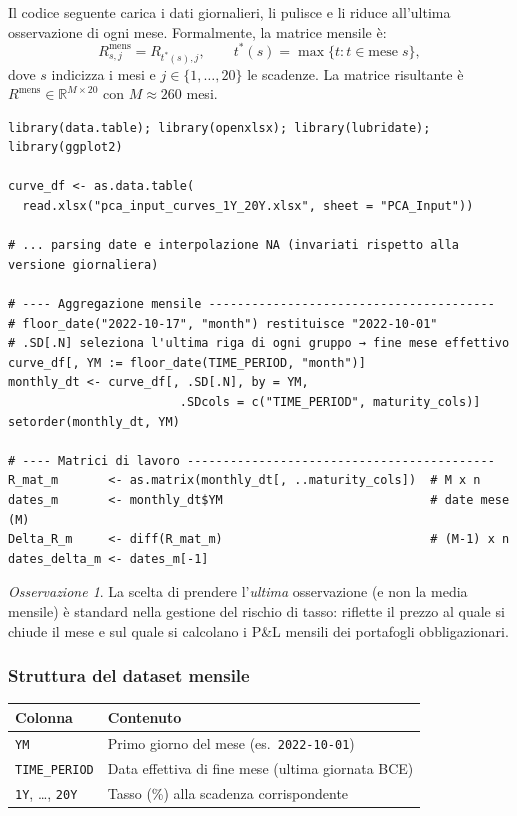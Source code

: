 \documentclass[11pt,a4paper]{article}
\theoremstyle{plain}
\theoremstyle{definition}
\theoremstyle{remark}
\newtheorem*{osservazione}{Osservazione}
\begin{document}
Il codice seguente carica i dati giornalieri, li pulisce e li riduce all'ultima
osservazione di ogni mese. Formalmente, la matrice mensile è:
\[
R^{\text{mens}}_{s,j} = R_{t^*(s),j}, \qquad
t^*(s) = \max\{t : t \in \text{mese}\; s\},
\]
dove $s$ indicizza i mesi e $j \in \{1,\ldots,20\}$ le scadenze.
La matrice risultante è $R^{\text{mens}} \in \mathbb{R}^{M \times 20}$
con $M \approx 260$ mesi. 

\begin{codebox}
\begin{Verbatim}[fontsize=\small]
library(data.table); library(openxlsx); library(lubridate); library(ggplot2)

curve_df <- as.data.table(
  read.xlsx("pca_input_curves_1Y_20Y.xlsx", sheet = "PCA_Input"))

# ... parsing date e interpolazione NA (invariati rispetto alla versione giornaliera)

# ---- Aggregazione mensile ----------------------------------------
# floor_date("2022-10-17", "month") restituisce "2022-10-01"
# .SD[.N] seleziona l'ultima riga di ogni gruppo → fine mese effettivo
curve_df[, YM := floor_date(TIME_PERIOD, "month")]
monthly_dt <- curve_df[, .SD[.N], by = YM,
                        .SDcols = c("TIME_PERIOD", maturity_cols)]
setorder(monthly_dt, YM)

# ---- Matrici di lavoro -------------------------------------------
R_mat_m       <- as.matrix(monthly_dt[, ..maturity_cols])  # M x n
dates_m       <- monthly_dt$YM                             # date mese (M)
Delta_R_m     <- diff(R_mat_m)                             # (M-1) x n
dates_delta_m <- dates_m[-1]
\end{Verbatim}
\end{codebox}

\begin{osservazione}
La scelta di prendere l'\emph{ultima} osservazione (e non la media mensile) \`e
standard nella gestione del rischio di tasso: riflette il prezzo al quale si
chiude il mese e sul quale si calcolano i P\&L mensili dei portafogli obbligazionari.
\end{osservazione}

\subsubsection{Struttura del dataset mensile}

\begin{center}
\begin{tabular}{ll}
\toprule
Colonna & Contenuto \\
\midrule
\texttt{YM} & Primo giorno del mese (es.\ \texttt{2022-10-01}) \\
\texttt{TIME\_PERIOD} & Data effettiva di fine mese (ultima giornata BCE) \\
\texttt{1Y}, \dots, \texttt{20Y} & Tasso (\%) alla scadenza corrispondente \\
\bottomrule
\end{tabular}
\end{center}
\end{document}
